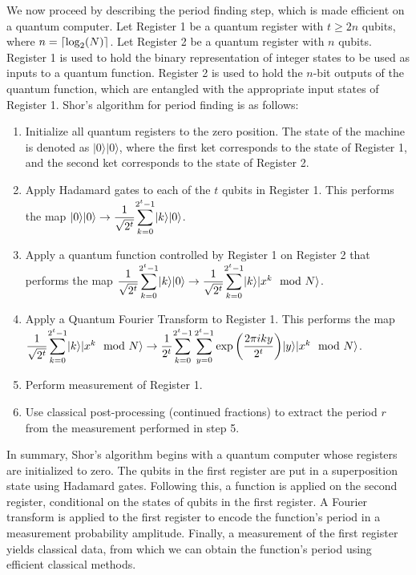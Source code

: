 \documentclass{article}
\DeclarePairedDelimiter\ceil{\lceil}{\rceil}
\begin{document}
We now proceed by describing the period finding step, which is made efficient on a quantum computer. Let Register 1 be a quantum register with $t\geq 2n$ qubits, where $n = \ceil*{\log_2(N)}$. Let Register 2 be a quantum register with $n$ qubits. Register 1 is used to hold the binary representation of integer states to be used as inputs to a quantum function. Register 2 is used to hold the $n$-bit outputs of the quantum function, which are entangled with the appropriate input states of Register 1. Shor's algorithm for period finding is as follows:
\begin{enumerate}
\item Initialize all quantum registers to the zero position. The state of the machine is denoted as $|0\rangle|0\rangle$, where the first ket corresponds to the state of Register 1, and the second ket corresponds to the state of Register 2.
\item Apply Hadamard gates to each of the $t$ qubits in Register 1. This performs the map $|0\rangle|0\rangle \to \dfrac{1}{\sqrt{2^t}}\mathlarger{\sum_{k=0}^{2^t-1}}|k\rangle|0\rangle$.
\item Apply a quantum function controlled by Register 1 on Register 2 that performs the map $\dfrac{1}{\sqrt{2^t}}\mathlarger{\sum_{k=0}^{2^t-1}}|k\rangle|0\rangle \to \dfrac{1}{\sqrt{2^t}}\mathlarger{\sum_{k=0}^{2^t-1}}|k\rangle|x^k \mod N\rangle$.
\item Apply a Quantum Fourier Transform to Register 1. This performs the map $\dfrac{1}{\sqrt{2^t}}\mathlarger{\sum_{k=0}^{2^t-1}}|k\rangle|x^k \mod N\rangle \to \dfrac{1}{{2^t}}\mathlarger{\sum_{k=0}^{2^t-1}\sum_{y=0}^{2^t-1}}\exp{\left(\dfrac{2\pi iky}{2^t}\right)}|y\rangle|x^k \mod N\rangle$.
\item Perform measurement of Register 1.
\item Use classical post-processing (continued fractions) to extract the period $r$ from the measurement performed in step 5.
\end{enumerate}


In summary, Shor's algorithm begins with a quantum computer whose registers are initialized to zero. The qubits in the first register are put in a superposition state using Hadamard gates. Following this, a function is applied on the second register, conditional on the states of qubits in the first register. A Fourier transform is applied to the first register to encode the function's period in a measurement probability amplitude. Finally, a measurement of the first register yields classical data, from which we can obtain the function's period using efficient classical methods.
\end{document}
